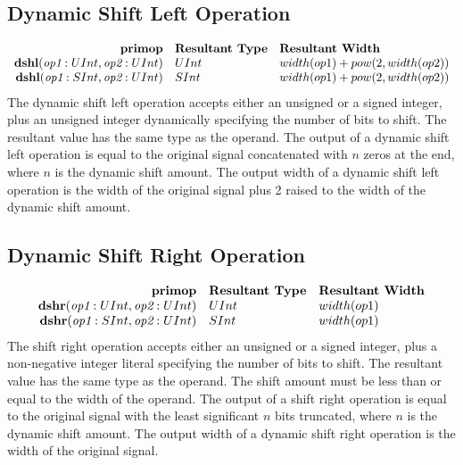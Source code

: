 \documentclass[12pt]{article}
\begin{document}
\subsection{Dynamic Shift Left Operation}
\[
\begin{array}{rll}
\text{\bf primop} & \text{\bf Resultant Type} & \text{\bf Resultant Width} \\
\text{\bf dshl}(\text{\em op1}:UInt, \text{\em op2}:UInt)  & UInt & width(op1) + pow(2,width(op2)) \\
\text{\bf dshl}(\text{\em op1}:SInt, \text{\em op2}:UInt)  & SInt & width(op1) + pow(2,width(op2)) \\
\end{array}
\]
The dynamic shift left operation accepts either an unsigned or a signed integer, plus an unsigned integer dynamically specifying the number of bits to shift.
The resultant value has the same type as the operand.
The output of a dynamic shift left operation is equal to the original signal concatenated with $n$ zeros at the end, where $n$ is the dynamic shift amount.
The output width of a dynamic shift left operation is the width of the original signal plus 2 raised to the width of the dynamic shift amount.

\subsection{Dynamic Shift Right Operation}
\[
\begin{array}{rll}
\text{\bf primop} & \text{\bf Resultant Type} & \text{\bf Resultant Width} \\
\text{\bf dshr}(\text{\em op1}:UInt, \text{\em op2}:UInt)  & UInt & width(op1) \\
\text{\bf dshr}(\text{\em op1}:SInt, \text{\em op2}:UInt)  & SInt & width(op1) \\
\end{array}
\]
The shift right operation accepts either an unsigned or a signed integer, plus a non-negative integer literal specifying the number of bits to shift.
The resultant value has the same type as the operand.
The shift amount must be less than or equal to the width of the operand.
The output of a shift right operation is equal to the original signal with the least significant $n$ bits truncated, where $n$ is the dynamic shift amount.
The output width of a dynamic shift right operation is the width of the original signal.
\end{document}
